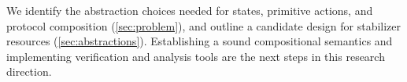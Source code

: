 We identify the abstraction choices needed for states, primitive actions, and protocol composition (\cref{sec:problem}), and outline a candidate design for stabilizer resources (\cref{sec:abstractions}). Establishing a sound compositional semantics and implementing verification and analysis tools are the next steps in this research direction.
